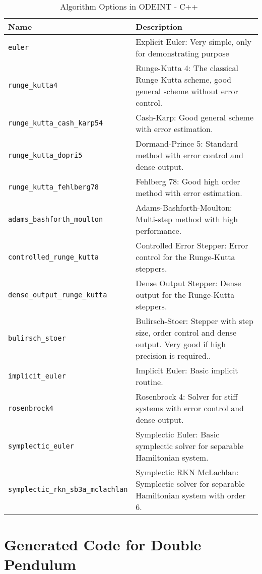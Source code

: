 \begin{table}
\begin{tabular}{ p{} p{} }
	\textbf{Name} & \textbf{Description} \\
	\toprule
	\verb|euler| & Explicit Euler: Very simple, only for demonstrating purpose\\ \hline
	\verb|runge_kutta4| & Runge-Kutta 4: The classical Runge Kutta scheme, good general scheme without error control.\\ \hline
	\verb|runge_kutta_cash_karp54| & Cash-Karp: Good general scheme with error estimation.\\ \hline
	\verb|runge_kutta_dopri5| & Dormand-Prince 5: Standard method with error control and dense output.\\ \hline
	\verb|runge_kutta_fehlberg78| & Fehlberg 78: Good high order method with error estimation.\\ \hline
	\verb|adams_bashforth_moulton| & Adams-Bashforth-Moulton: Multi-step method with high performance.\\ \hline
	\verb|controlled_runge_kutta| & Controlled Error Stepper: Error control for the Runge-Kutta steppers.\\ \hline
	\verb|dense_output_runge_kutta| & Dense Output Stepper: Dense output for the Runge-Kutta steppers.\\ \hline
	\verb|bulirsch_stoer| & Bulirsch-Stoer: Stepper with step size, order control and dense output. Very good if high precision is required..\\ \hline
	\verb|implicit_euler| & Implicit Euler: Basic implicit routine.\\ \hline
	\verb|rosenbrock4| & Rosenbrock 4: Solver for stiff systems with error control and dense output.\\ \hline
	\verb|symplectic_euler| & Symplectic Euler: Basic symplectic solver for separable Hamiltonian system.\\ \hline
	\verb|symplectic_rkn_sb3a_mclachlan| & Symplectic RKN McLachlan: Symplectic solver for separable Hamiltonian system with order 6.\\
	\bottomrule	
\end{tabular}	
\caption{Algorithm Options in ODEINT - C++~\citep{odeintfun}}	
\label{tab_algodeint}
\end{table}

\pagebreak

\section{Generated Code for Double Pendulum}
\label{gencodedbl}
 
